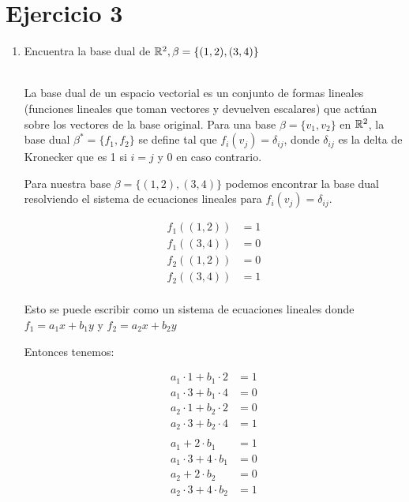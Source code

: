 \section*{Ejercicio 3}

\begin{enumerate}
    \item Encuentra la base dual de $\mathbb{R}^{2}, \beta = \{ (1,2),(3,4) \}$
    
    \noindent \solucion \\

    La base dual de un espacio vectorial es un conjunto de formas lineales
    (funciones lineales que toman vectores y devuelven escalares) que 
    actúan sobre los vectores de la base original. Para una base $\beta = \{v_{1},v_{2}\}$
    en $\mathbb{R}^{2}$, la base dual $\beta^{*} = \{ f_{1},f_{2} \}$ se define tal que
    $f_{i}(v_{j}) = \delta_{ij}$, donde $\delta_{ij}$ es la delta de Kronecker que es 1 si
    $i = j$ y 0 en caso contrario.

    Para nuestra base $\beta = \{ (1,2),(3,4) \}$ podemos encontrar la base dual
    resolviendo el sistema de ecuaciones lineales para $f_{i}(v_{j}) = \delta_{ij}$.

    \begin{align*}
        f_1((1,2)) & = 1 \\
        f_1((3,4)) & = 0 \\
        f_2((1,2)) & = 0 \\
        f_2((3,4)) & = 1 \\
    \end{align*}

    Esto se puede escribir como un sistema de ecuaciones lineales donde
    $f_{1} = a_{1}x + b_{1}y$ y $f_{2} = a_{2}x + b_{2}y$
    
    Entonces tenemos:

    \begin{align*}
        a_{1}\cdot1 + b_{1}\cdot2 &= 1 \\
        a_{1}\cdot3 + b_{1}\cdot4 &= 0 \\
        a_{2}\cdot1 + b_{2}\cdot2 &= 0 \\
        a_{2}\cdot3 + b_{2}\cdot4 &= 1 \\
    \end{align*}
    \begin{align*}
        a_{1}   + 2 \cdot b_{1} &= 1 \\
        a_{1}\cdot3 + 4 \cdot b_{1} &= 0 \\
        a_{2}   + 2 \cdot b_{2} &= 0 \\
        a_{2}\cdot3 + 4 \cdot b_{2} &= 1 \\
    \end{align*}


\end{enumerate}
